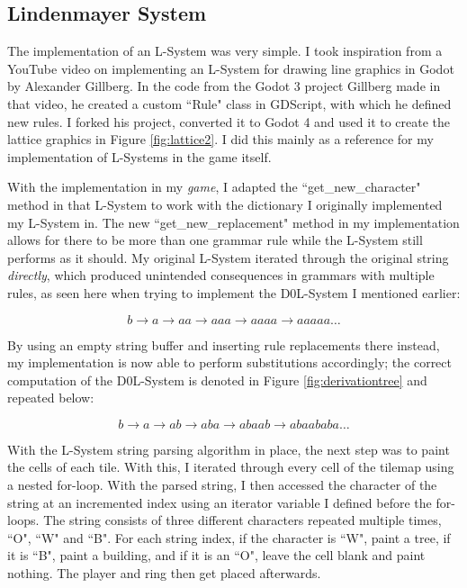 \subsection{Lindenmayer System} \label{implsys1}

The implementation of an L-System was very simple. I took inspiration from a YouTube video on implementing an L-System for drawing line graphics in Godot by Alexander Gillberg.\cite{codatGD3LSystemYT} In the code from the Godot 3 project Gillberg made in that video\cite{codatGD3LSystemGH}\cite{codatGD3LSystemYT}, he created a custom ``Rule" class in GDScript, with which he defined new rules. I forked his project, converted it to Godot 4 and used it to create the lattice graphics in Figure \ref{fig:lattice2}.\cite{codatGD4LSystemGH} I did this mainly as a reference for my implementation of L-Systems in the game itself.

With the implementation in my \emph{game}, I adapted the ``get\_new\_character" method in that L-System to work with the dictionary I originally implemented my L-System in. The new ``get\_new\_replacement" method in my implementation allows for there to be more than one grammar rule while the L-System still performs as it should. My original L-System iterated through the original string \textit{directly}, which produced unintended consequences in grammars with multiple rules, as seen here when trying to implement the D0L-System I mentioned earlier\cite{lsystemintro}:

$$ b \rightarrow a \rightarrow aa \rightarrow aaa \rightarrow aaaa \rightarrow aaaaa \ldots $$

By using an empty string buffer and inserting rule replacements there instead, my implementation is now able to perform substitutions accordingly; the correct computation of the D0L-System is denoted in Figure \ref{fig:derivationtree} and repeated below:

$$ b \rightarrow a \rightarrow ab \rightarrow aba \rightarrow abaab \rightarrow abaababa \ldots $$

With the L-System string parsing algorithm in place, the next step was to paint the cells of each tile. With this, I iterated through every cell of the tilemap using a nested for-loop. With the parsed string, I then accessed the character of the string at an incremented index using an iterator variable I defined before the for-loops. The string consists of three different characters repeated multiple times, ``O", ``W" and ``B". For each string index, if the character is ``W", paint a tree, if it is ``B", paint a building, and if it is an ``O", leave the cell blank and paint nothing. The player and ring then get placed afterwards.

